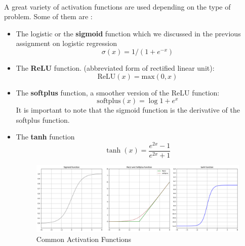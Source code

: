 \documentclass{article}
\begin{document}
      \paragraph{} A great variety of activation functions are used depending on the type of problem. Some of them are :
      \begin{itemize}
        \item The logistic or the \textbf{sigmoid} function which we discussed in the previous assignment on logistic regression
	        \begin{equation*}
		        \sigma (x) = 1 / (1 + e^{-x})
	        \end{equation*}

          \item The \textbf{ReLU} function. (abbreviated form of rectified linear unit):
          \begin{equation*}
            \text{ReLU}(x) = \text{max}(0,x)
          \end{equation*}

          \item The \textbf{softplus} function, a smoother version of the ReLU function:
	          \begin{equation*}
		          \text{softplus}(x) = \log{1+ e^x}
	          \end{equation*}
            It is important to note that the sigmoid function is the derivative of the softplus function.

            \item The \textbf{tanh} function
            \begin{equation*}
              \tanh (x) = \frac{e^{2x} -1}{e^{2x} + 1}
            \end{equation*}
              
            \begin{figure}[H]
              \centering
              \includegraphics[width=1\textwidth]{plot.png}
              \caption{Common Activation Functions}
           \end{figure}

           
      \end{itemize}
\end{document}
